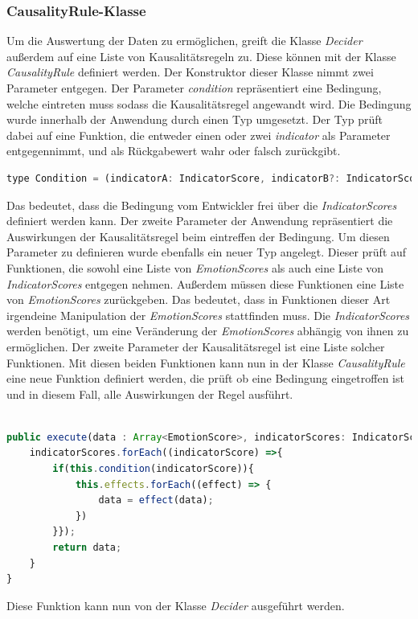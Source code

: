 \subsubsection{CausalityRule-Klasse}
Um die Auswertung der Daten zu ermöglichen, greift die Klasse \textit{Decider} außerdem auf eine Liste von Kausalitätsregeln zu. Diese können mit der Klasse \textit{CausalityRule} definiert werden.
Der Konstruktor dieser Klasse nimmt zwei Parameter entgegen. Der Parameter \textit{condition} repräsentiert eine Bedingung, welche eintreten muss sodass die Kausalitätsregel angewandt wird. Die Bedingung wurde innerhalb der Anwendung durch einen Typ umgesetzt. Der Typ prüft dabei auf eine Funktion, die entweder einen oder zwei \textit{indicator} als Parameter entgegennimmt, und als Rückgabewert wahr oder falsch zurückgibt.\newline \newline \newline
\begin{lstlisting}[caption={Typ condition}, language=JavaScript]
	type Condition = (indicatorA: IndicatorScore, indicatorB?: IndicatorScore) => boolean;
\end{lstlisting}
Das bedeutet, dass die Bedingung vom Entwickler frei über die \textit{IndicatorScores} definiert werden kann. Der zweite Parameter der Anwendung repräsentiert die Auswirkungen der Kausalitätsregel beim eintreffen der Bedingung. Um diesen Parameter zu definieren wurde ebenfalls ein neuer Typ angelegt. Dieser prüft auf Funktionen, die sowohl eine Liste von \textit{EmotionScores} als auch eine Liste von \textit{IndicatorScores} entgegen nehmen. Außerdem müssen diese Funktionen eine Liste von \textit{EmotionScores} zurückgeben. Das bedeutet, dass in Funktionen dieser Art irgendeine Manipulation der \textit{EmotionScores} stattfinden muss. Die \textit{IndicatorScores} werden benötigt, um eine Veränderung der \textit{EmotionScores} abhängig von ihnen zu ermöglichen. Der zweite Parameter der Kausalitätsregel ist eine Liste solcher Funktionen. Mit diesen beiden Funktionen kann nun in der Klasse \textit{CausalityRule} eine neue Funktion definiert werden, die prüft ob eine Bedingung eingetroffen ist und in diesem Fall, alle Auswirkungen der Regel ausführt. \newline
\begin{lstlisting}[caption={execute Funktion der Klasse CausalityRule},language=JavaScript]

public execute(data : Array<EmotionScore>, indicatorScores: IndicatorScore[]) {
	indicatorScores.forEach((indicatorScore) =>{
		if(this.condition(indicatorScore)){
			this.effects.forEach((effect) => {
				data = effect(data);
			})
		}});
		return data;
	}
}

\end{lstlisting}
Diese Funktion kann nun von der Klasse \textit{Decider} ausgeführt werden. \newpage
